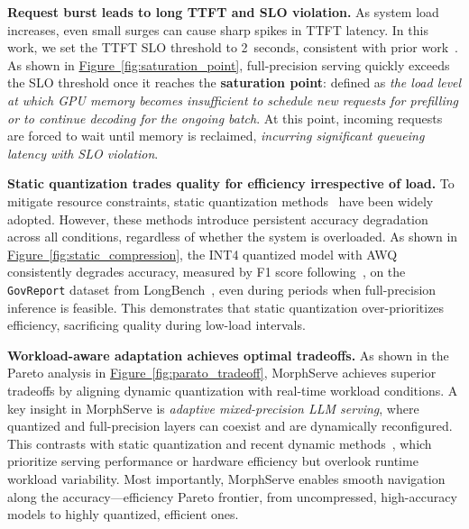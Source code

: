 \documentclass{article}
\newcommand{\system}{{MorphServe}\xspace}
\begin{document}
\textbf{Request burst leads to long TTFT and SLO violation.}
As system load increases, even small surges can cause sharp spikes in TTFT latency. In this work, we set the TTFT SLO threshold to 2~seconds, consistent with prior work~\cite{xiong2024layerkv, gao2024cost_cachedattention, qiao2024conserve}. As shown in \hyperref[fig:saturation_point]{Figure~\ref{fig:saturation_point}}, full-precision serving quickly exceeds the SLO threshold once it reaches the \textbf{saturation point}: defined as \textit{the load level at which GPU memory becomes insufficient to schedule new requests for prefilling or to continue decoding for the ongoing batch}. 
At this point, incoming requests are forced to wait until memory is reclaimed, \textit{incurring significant queueing latency with SLO violation}.  

\textbf{Static quantization trades quality for efficiency irrespective of load.} 
To mitigate resource constraints, static quantization methods~\cite{lin2024awq,frantar2022gptq,lin2024duquant} have been widely adopted. However, these methods introduce persistent accuracy degradation across all conditions, regardless of whether the system is overloaded.
As shown in \hyperref[fig:static_compression]{Figure~\ref{fig:static_compression}}, the INT4 quantized model with AWQ~\cite{lin2024awq} consistently degrades accuracy, measured by F1 score following~\cite{lin2024duquant}, on the {\small\texttt{GovReport}} dataset from LongBench~\cite{bai2023longbench}, even during periods when full-precision inference is feasible. This demonstrates that static quantization over-prioritizes efficiency, sacrificing quality during low-load intervals.

\textbf{Workload-aware adaptation achieves optimal tradeoffs.}
As shown in the Pareto analysis in \hyperref[fig:parato_tradeoff]{Figure~\ref{fig:parato_tradeoff}}, {\system} achieves superior tradeoffs by aligning dynamic quantization with real-time workload conditions.
{A key insight in MorphServe is \textit{adaptive mixed-precision LLM serving}, where quantized and full-precision layers can coexist and are dynamically reconfigured.}
This contrasts with static quantization and recent dynamic methods~\cite{chen2024progressive_quant, frantar2025marlin_mixed_precision, reggiani2023mix_precision}, which prioritize serving performance or hardware efficiency but overlook runtime workload variability.
Most importantly, {\system} enables smooth navigation along the accuracy---efficiency Pareto frontier, from uncompressed, high-accuracy models to highly quantized, efficient ones.
\end{document}
